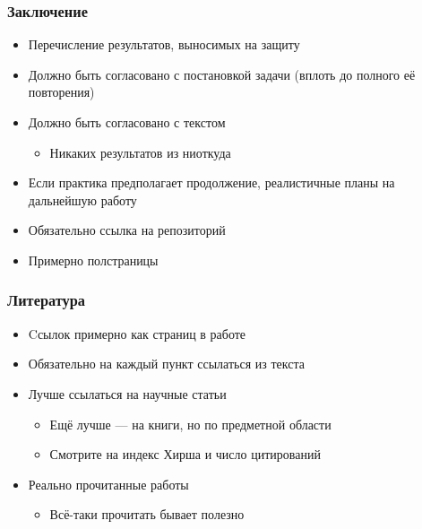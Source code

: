 \documentclass{../../slides-style}
\begin{document}
    \begin{frame}
        \frametitle{Заключение}
        \begin{itemize}
            \item Перечисление результатов, выносимых на защиту
            \item Должно быть согласовано с постановкой задачи (вплоть до полного её повторения)
            \item Должно быть согласовано с текстом
            \begin{itemize}
                \item Никаких результатов из ниоткуда
            \end{itemize}
            \item Если практика предполагает продолжение, реалистичные планы на дальнейшую работу
            \item Обязательно ссылка на репозиторий
            \item Примерно полстраницы
        \end{itemize}
    \end{frame}

    \begin{frame}
        \frametitle{Литература}
        \begin{itemize}
            \item Cсылок примерно как страниц в работе
            \item Обязательно на каждый пункт ссылаться из текста
            \item Лучше ссылаться на научные статьи
            \begin{itemize}
                \item Ещё лучше --- на книги, но по предметной области
                \item Смотрите на индекс Хирша и число цитирований
            \end{itemize}
            \item Реально прочитанные работы
            \begin{itemize}
                \item Всё-таки прочитать бывает полезно
            \end{itemize}
        \end{itemize}
    \end{frame}
\end{document}
